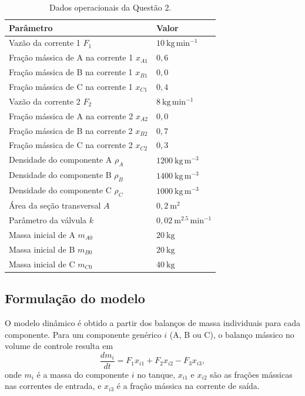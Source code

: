 \documentclass{article}
\begin{document}
\begin{table}[ht]
  \centering
  \begin{tabular}{ll}
    \hline
    \textbf{Parâmetro} & \textbf{Valor} \\
    \hline
    Vazão da corrente 1 $F_1$ & $10\ \mathrm{kg\,min^{-1}}$ \\
    Fração mássica de A na corrente 1 $x_{A1}$ & $0{,}6$ \\
    Fração mássica de B na corrente 1 $x_{B1}$ & $0{,}0$ \\
    Fração mássica de C na corrente 1 $x_{C1}$ & $0{,}4$ \\
    Vazão da corrente 2 $F_2$ & $8\ \mathrm{kg\,min^{-1}}$ \\
    Fração mássica de A na corrente 2 $x_{A2}$ & $0{,}0$ \\
    Fração mássica de B na corrente 2 $x_{B2}$ & $0{,}7$ \\
    Fração mássica de C na corrente 2 $x_{C2}$ & $0{,}3$ \\
    Densidade do componente A $\rho_A$ & $1200\ \mathrm{kg\,m^{-3}}$ \\
    Densidade do componente B $\rho_B$ & $1400\ \mathrm{kg\,m^{-3}}$ \\
    Densidade do componente C $\rho_C$ & $1000\ \mathrm{kg\,m^{-3}}$ \\
    Área da seção transversal $A$ & $0{,}2\ \mathrm{m^2}$ \\
    Parâmetro da válvula $k$ & $0{,}02\ \mathrm{m^{2.5}\,min^{-1}}$ \\
    Massa inicial de A $m_{A0}$ & $20\ \mathrm{kg}$ \\
    Massa inicial de B $m_{B0}$ & $20\ \mathrm{kg}$ \\
    Massa inicial de C $m_{C0}$ & $40\ \mathrm{kg}$ \\
    \hline
  \end{tabular}
  \caption{Dados operacionais da Questão 2.}
  \label{tab:dados-q2}
\end{table}

\subsection*{Formulação do modelo}

O modelo dinâmico é obtido a partir dos balanços de massa individuais para cada componente. Para um componente genérico $i$ (A, B ou C), o balanço mássico no volume de controle resulta em
\begin{equation*}
  \frac{dm_i}{dt} = F_1 x_{i1} + F_2 x_{i2} - F_3 x_{i3},
\end{equation*}
onde $m_i$ é a massa do componente $i$ no tanque, $x_{i1}$ e $x_{i2}$ são as frações mássicas nas correntes de entrada, e $x_{i3}$ é a fração mássica na corrente de saída.
\end{document}
